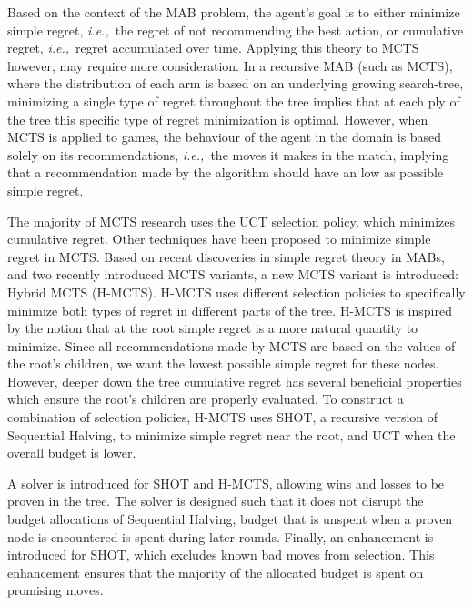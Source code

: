 \documentclass{kecsmstr}
\newcommand{\ie}{{\it i.e.,}~}
\begin{document}
\vspace{2mm}

Based on the context of the MAB problem, the agent's goal is to either minimize simple regret, \ie the regret of not recommending the best action, or cumulative regret, \ie regret accumulated over time. Applying this theory to MCTS however, may require more consideration. In a recursive MAB (such as MCTS), where the distribution of each arm is based on an underlying growing search-tree, minimizing a single type of regret throughout the tree implies that at each ply of the tree this specific type of regret minimization is optimal. However, when MCTS is applied to games, the behaviour of the agent in the domain is based solely on its recommendations, \ie the moves it makes in the match, implying that a recommendation made by the algorithm should have an low as possible simple regret.

\vspace{2mm}

The majority of MCTS research uses the UCT selection policy, which minimizes cumulative regret. Other techniques have been proposed to minimize simple regret in MCTS. Based on recent discoveries in simple regret theory in MABs, and two recently introduced MCTS variants, a new MCTS variant is introduced: Hybrid MCTS (H-MCTS). H-MCTS uses different selection policies to specifically minimize both types of regret in different parts of the tree. H-MCTS is inspired by the notion that at the root simple regret is a more natural quantity to minimize. Since all recommendations made by MCTS are based on the values of the root's children, we want the lowest possible simple regret for these nodes. However, deeper down the tree cumulative regret has several beneficial properties which ensure the root's children are properly evaluated. To construct a combination of selection policies, H-MCTS uses SHOT, a recursive version of Sequential Halving, to minimize simple regret near the root, and UCT when the overall budget is lower. 

\vspace{2mm}

A solver is introduced for SHOT and H-MCTS, allowing wins and losses to be proven in the tree. The solver is designed such that it does not disrupt the budget allocations of Sequential Halving, budget that is unspent when a proven node is encountered is spent during later rounds. Finally, an enhancement is introduced for SHOT, which excludes known bad moves from selection. This enhancement ensures that the majority of the allocated budget is spent on promising moves.
\end{document}
